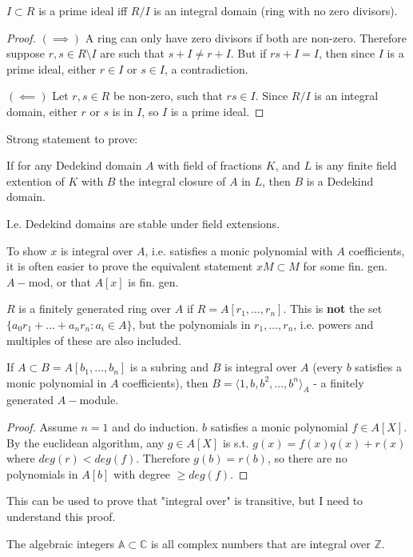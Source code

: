 \begin{prop}
$I\subset R$ is a prime ideal iff $R/I$ is an integral domain (ring with no zero divisors).
\end{prop}
\begin{proof}
$(\implies)$ A ring can only have zero divisors if both are non-zero. Therefore suppose $r,s\in R\setminus{I}$ are such that $s+I\neq r+I$. But if $rs+I=I$, then since $I$ is a prime ideal, either $r\in I$ or $s\in I$, a contradiction.

$(\impliedby)$ Let $r,s\in R$ be non-zero, such that $rs\in I$. Since $R/I$ is an integral domain, either $r$ or $s$ is in $I$, so $I$ is a prime ideal.
\end{proof}

Strong statement to prove: 
\begin{theorem}
If for any Dedekind domain $A$ with field of fractions $K$, and $L$ is any finite field extention of $K$ with $B$ the integral closure of $A$ in $L$, then $B$ is a Dedekind domain.
\end{theorem}

I.e. Dedekind domains are stable under field extensions.

To show $x$ is integral over $A$, i.e. satisfies a monic polynomial with $A$ coefficients, it is often easier to prove the equivalent statement $xM\subset M$ for some fin. gen. $A-$mod, or that $A[x]$ is fin. gen.

$R$ is a finitely generated ring over $A$ if $R=A[r_1,\dots,r_n]$. This is \textbf{not} the set $\{a_0r_1+\dots+a_nr_n:a_i\in A\}$, but the polynomials in $r_1,\dots,r_n$, i.e. powers and multiples of these are also included.
\begin{prop}
If $A\subset B=A[b_1,\dots,b_n]$ is a subring and $B$ is integral over $A$ (every $b$ satisfies a monic polynomial in $A$ coefficients), then $B=\langle1,b,b^2,\dots,b^n\rangle_A$ - a finitely generated $A-$module. 
\end{prop}
\begin{proof}
Assume $n=1$ and do induction. $b$ satisfies a monic polynomial $f\in A[X]$. By the euclidean algorithm, any $g\in A[X]$ is s.t. $g(x)=f(x)q(x)+r(x)$ where $deg(r)<deg(f)$. Therefore $g(b)=r(b)$, so there are no polynomials in $A[b]$ with degree $\geq deg(f)$.
\end{proof}
This can be used to prove that "integral over" is transitive, but I need to understand this proof.

\begin{definition}
The algebraic integers $\mathbb{A}\subset \mathbb{C}$ is all complex numbers that are integral over $\mathbb{Z}$.
\end{definition}

